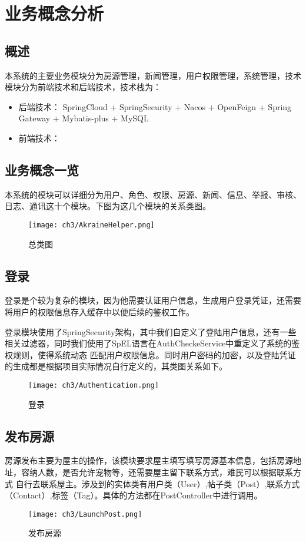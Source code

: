 \chapter{业务概念分析}
\section{概述}
本系统的主要业务模块分为房源管理，新闻管理，用户权限管理，系统管理，技术模块分为前端技术和后端技术，技术栈为：
\begin{itemize}
    \item 后端技术： SpringCloud + SpringSecurity + Nacos + OpenFeign + Spring Gateway + Mybatis-plus + MySQL
    \item 前端技术： 
\end{itemize}
\section{业务概念一览}
本系统的模块可以详细分为用户、角色、权限、房源、新闻、信息、举报、审核、日志、通讯这十个模块。下图为这几个模块的关系类图。
\begin{figure}[htbp]
    \centering
    \texttt{[image: ch3/AkraineHelper.png]}
    \caption{总类图}\label{fig:AkraineHelper}
    \vspace{\baselineskip} %
\end{figure}
\section{登录}
登录是个较为复杂的模块，因为他需要认证用户信息，生成用户登录凭证，还需要将用户的权限信息存入缓存中以便后续的鉴权工作。

登录模块使用了SpringSecurity架构，其中我们自定义了登陆用户信息，还有一些相关过滤器，同时我们使用了SpEL语言在AuthCheckeService中重定义了系统的鉴权规则，使得系统动态
匹配用户权限信息。同时用户密码的加密，以及登陆凭证的生成都是根据项目实际情况自行定义的，其类图关系如下。
\begin{figure}[htbp]
    \centering
    \texttt{[image: ch3/Authentication.png]}
    \caption{登录}\label{fig:Authentication}
    \vspace{\baselineskip} %
\end{figure}
\section{发布房源}
房源发布主要为屋主的操作，该模块要求屋主填写填写房源基本信息，包括房源地址，容纳人数，是否允许宠物等，还需要屋主留下联系方式，难民可以根据联系方式
自行去联系屋主。涉及到的实体类有用户类（User）,帖子类（Post）,联系方式（Contact）,标签（Tag）。具体的方法都在PostController中进行调用。
\begin{figure}[htbp]
    \centering
    \texttt{[image: ch3/LaunchPost.png]}
    \caption{发布房源}\label{fig:LaunchPost}
    \vspace{\baselineskip} %
\end{figure}
